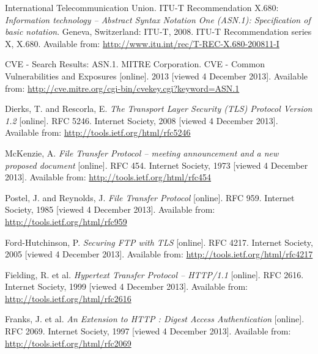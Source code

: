 
\def\bibname{Bibliography}
\begin{thebibliography}{99}
\addcontentsline{toc}{chapter}{\bibname}


	{\sc International Telecommunication Union}.
	ITU-T Recommendation X.680:
	\emph{Information technology -- Abstract Syntax Notation One (ASN.1): Specification of basic notation}.
	Geneva, Switzerland: ITU-T, 2008.
	ITU-T Recommendation series X, X.680.
	Available from: \url{http://www.itu.int/rec/T-REC-X.680-200811-I}

	CVE - Search Results: ASN.1.
	{\sc MITRE Corporation}.
	CVE - Common Vulnerabilities and Exposures
	[online].
	2013 [viewed 4 December 2013].
	Available from: \url{http://cve.mitre.org/cgi-bin/cvekey.cgi?keyword=ASN.1}

	{\sc Dierks,} T. and {\sc Rescorla}, E.
	\emph{The Transport Layer Security (TLS) Protocol Version 1.2}
	[online].
	RFC 5246.
	Internet Society, 2008 [viewed 4 December 2013].
	Available from: \url{http://tools.ietf.org/html/rfc5246}


	{\sc McKenzie,} A.
	\emph{File Transfer Protocol -- meeting announcement and a new proposed document}
	[online].
	RFC 454.
	Internet Society, 1973 [viewed 4 December 2013].
	Available from: \url{http://tools.ietf.org/html/rfc454}

	{\sc Postel,} J. and {\sc Reynolds}, J.
	\emph{File Transfer Protocol}
	[online].
	RFC 959.
	Internet Society, 1985 [viewed 4 December 2013].
	Available from: \url{http://tools.ietf.org/html/rfc959}

	{\sc Ford-Hutchinson,} P.
	\emph{Securing FTP with TLS}
	[online].
	RFC 4217.
	Internet Society, 2005 [viewed 4 December 2013].
	Available from: \url{http://tools.ietf.org/html/rfc4217}

	{\sc Fielding,} R. et al.
	\emph{Hypertext Transfer Protocol -- HTTP/1.1}
	[online].
	RFC 2616.
	Internet Society, 1999 [viewed 4 December 2013].
	Available from: \url{http://tools.ietf.org/html/rfc2616}

	{\sc Franks,} J. et al.
	\emph{An Extension to HTTP : Digest Access Authentication}
	[online].
	RFC 2069.
	Internet Society, 1997 [viewed 4 December 2013].
	Available from: \url{http://tools.ietf.org/html/rfc2069}


\end{thebibliography}
